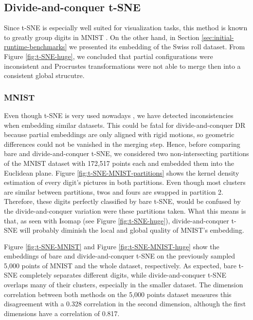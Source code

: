 \subsection{Divide-and-conquer t-SNE}
\label{sec:dc-t-SNE}

Since t-SNE is especially well suited for visualization tasks, this method is known to greatly group digits in MNIST \citep{Vandermaaten2008}. On the other hand, in Section \ref{sec:initial-runtime-benchmarks} we presented its embedding of the Swiss roll dataset. From Figure \ref{fig:t-SNE-huge}, we concluded that partial configurations were inconsistent and Procrustes transformations were not able to merge then into a consistent global strucutre.

\subsubsection{MNIST}

Even though t-SNE is very used nowadays \citep{Wattenberg2016}, we have detected inconsistencies when embedding similar datasets. This could be fatal for divide-and-conquer DR because partial embeddings are only aligned with rigid motions, so geometric differences could not be vanished in the merging step. Hence, before comparing bare and divide-and-conquer t-SNE, we considered two non-intersecting partitions of the MNIST dataset with 172,517 points each and embedded them into the Euclidean plane. Figure \ref{fig:t-SNE-MNIST-partitions} shows the kernel density estimation of every digit's pictures in both partitions. Even though most clusters are similar between partitions, twos and fours are swapped in partition 2. Therefore, these digits perfectly classified by bare t-SNE, would be confused by the divide-and-conquer variation were these partitions taken. What this means is that, as seen with Isomap (see Figure \ref{fig:t-SNE-huge}), divide-and-conquer t-SNE will probably diminish the local and global quality of MNIST's embedding.

Figure \ref{fig:t-SNE-MNIST} and Figure \ref{fig:t-SNE-MNIST-huge} show the embeddings of bare and divide-and-conquer t-SNE on the previously sampled 5,000 points of MNIST and the whole dataset, respectively. As expected, bare t-SNE completely separates different digits, while divide-and-conquer t-SNE overlaps many of their clusters, especially in the smaller dataset. The dimension correlation between both methods on the 5,000 points dataset measures this disagreement with a 0.328 correlation in the second dimension, although the first dimensions have a correlation of 0.817.

